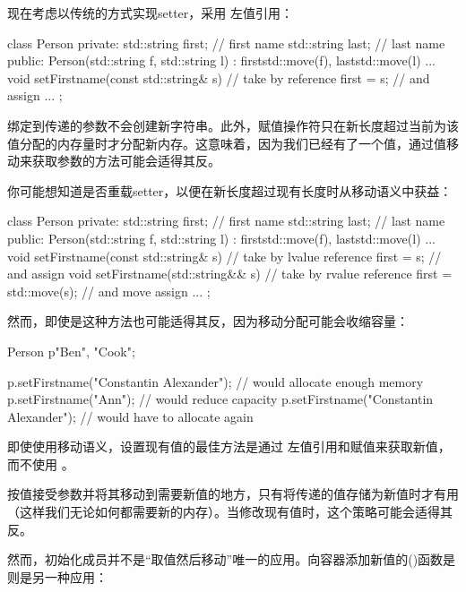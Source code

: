 现在考虑以传统的方式实现setter，采用  左值引用：

\begin{cppcode}
class Person {
private:
	std::string first; // first name
	std::string last; // last name
public:
	Person(std::string f, std::string l)
	: first{std::move(f)}, last{std::move(l)} {
	}
	...
	void setFirstname(const std::string& s) { // take by reference
		first = s; // and assign
	}
	...
};
\end{cppcode}

绑定到传递的参数不会创建新字符串。此外，赋值操作符只在新长度超过当前为该值分配的内存量时才分配新内存。这意味着，因为我们已经有了一个值，通过值移动来获取参数的方法可能会适得其反。

你可能想知道是否重载setter，以便在新长度超过现有长度时从移动语义中获益：

\begin{cppcode}
class Person {
private:
	std::string first; // first name
	std::string last; // last name
public:
	Person(std::string f, std::string l)
	: first{std::move(f)}, last{std::move(l)} {
	}
	...
	void setFirstname(const std::string& s) { // take by lvalue reference
		first = s; // and assign
	}
	void setFirstname(std::string&& s) { // take by rvalue reference
		first = std::move(s); // and move assign
	}
	...
};
\end{cppcode}

然而，即使是这种方法也可能适得其反，因为移动分配可能会收缩容量：

\begin{cppcode}
Person p{"Ben", "Cook"};

p.setFirstname("Constantin Alexander"); // would allocate enough memory
p.setFirstname("Ann"); // would reduce capacity
p.setFirstname("Constantin Alexander"); // would have to allocate again
\end{cppcode}

即使使用移动语义，设置现有值的最佳方法是通过  左值引用和赋值来获取新值，而不使用 。

按值接受参数并将其移动到需要新值的地方，只有将传递的值存储为新值时才有用（这样我们无论如何都需要新的内存）。当修改现有值时，这个策略可能会适得其反。

然而，初始化成员并不是“取值然后移动”唯一的应用。向容器添加新值的()函数是则是另一种应用：

